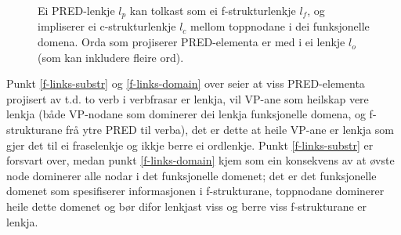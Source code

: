 \documentclass[11pt,a4paper,oneside,draft]{book}
\begin{document}
 \begin{figure}[htp]
    \centering
    

    \caption{Ei PRED-lenkje $l_p$ kan tolkast som ei f-strukturlenkje
    $l_f$, og impliserer ei c-strukturlenkje $l_c$ mellom toppnodane i
    dei funksjonelle domena. Orda som projiserer PRED-elementa er med
    i ei lenkje $l_o$ (som kan inkludere fleire ord).}
   \label{fig:viss-PRED-så-f-og-c}
 \end{figure}

Punkt \ref{f-links-substr} og \ref{f-links-domain} over seier at viss
PRED-elementa projisert av t.d. to verb i verbfrasar er lenkja, vil
VP-ane som heilskap vere lenkja (både VP-nodane som dominerer dei
lenkja funksjonelle domena, og f-strukturane frå ytre PRED til verba),
det er dette at heile VP-ane er lenkja som gjer det til ei fraselenkje
og ikkje berre ei ordlenkje. Punkt \ref{f-links-substr} er forsvart
over, medan punkt \ref{f-links-domain} kjem som ein konsekvens av at
øvste node dominerer alle nodar i det funksjonelle domenet; det er det
funksjonelle domenet som spesifiserer informasjonen i f-strukturane,
toppnodane dominerer heile dette domenet og bør difor lenkjast viss og
berre viss f-strukturane er lenkja.  
\end{document}
